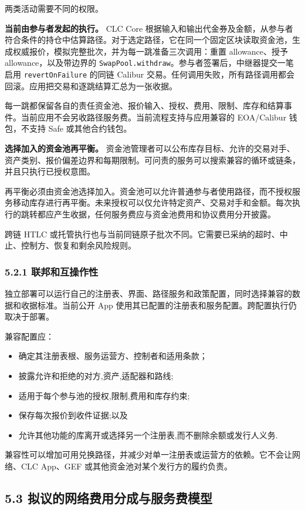 \documentclass[11pt]{article}
\begin{document}
两类活动需要不同的权限。

\textbf{当前由参与者发起的执行。} CLC Core 根据输入和输出代金券及金额，从参与者符合条件的持仓中估算路径。对于选定路径，它在同一个固定区块读取资金池，生成权威报价，模拟完整批次，并为每一跳准备三次调用：重置 allowance、授予 allowance，以及带边界的 \texttt{SwapPool.withdraw}。参与者签署后，中继器提交一笔启用 \texttt{revertOnFailure} 的同链 Calibur 交易。任何调用失败，所有路径调用都会回滚。应用把交易和逐跳结算汇总为一张收据。

每一跳都保留各自的责任资金池、报价输入、授权、费用、限制、库存和结算事件。当前应用不会另收路径服务费。当前流程支持与应用兼容的 EOA/Calibur 钱包，不支持 Safe 或其他合约钱包。

\textbf{选择加入的资金池再平衡。} 资金池管理者可以公布库存目标、允许的交易对手、资产类别、报价偏差边界和每期限制。可问责的服务可以搜索兼容的循环或链条，并且只执行已授权意图。

再平衡必须由资金池选择加入。资金池可以允许普通参与者使用路径，而不授权服务移动库存进行再平衡。未来授权可以仅允许特定资产、交易对手和金额。每次执行的跳转都应产生收据，任何服务费应与资金池费用和协议费用分开披露。

跨链 HTLC 或托管执行也与当前同链原子批次不同。它需要已采纳的超时、中止、控制方、恢复和剩余风险规则。

\subsubsection*{5.2.1 联邦和互操作性}

独立部署可以运行自己的注册表、界面、路径服务和政策配置，同时选择兼容的数据和收据标准。当前公开 App 使用其已配置的注册表和服务配置。跨配置执行仍取决于部署。

兼容配置应：

\begin{itemize}[leftmargin=*]
\item 确定其注册表根、服务运营方、控制者和适用条款；
\item 披露允许和拒绝的对方,资产,适配器和路线;
\item 适用于每个参与池的授权,限制,费用和库存约束;
\item 保存每次报价到收件证据;以及
\item 允许其他功能的库离开或选择另一个注册表,而不删除余额或发行人义务.
\end{itemize}
兼容性可以增加可用兑换路径，并减少对单一注册表或运营方的依赖。它不会让网络、CLC App、GEF 或其他资金池对某个发行方的履约负责。

\subsection*{5.3 拟议的网络费用分成与服务费模型}
\end{document}
